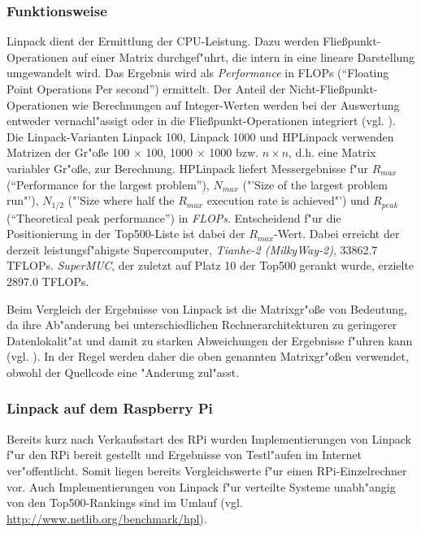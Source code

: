 
\subsubsection{Funktionsweise}\label{Funktion-Linpack}

Linpack dient der Ermittlung der CPU-Leistung. Dazu werden Flie\ss punkt-Operationen auf einer Matrix durchgef"uhrt, die intern in eine lineare Darstellung umgewandelt wird. Das Ergebnis wird als \textit{Performance} in FLOPs ("`Floating Point Operations Per second"') ermittelt. Der Anteil der Nicht-Flie\ss punkt-Operationen wie Berechnungen auf Integer-Werten werden bei der Auswertung entweder vernachl"assigt oder in die Flie\ss punkt-Operationen integriert (vgl. \cite{wei90}). Die Linpack-Varianten Linpack 100, Linpack 1000 und HPLinpack verwenden Matrizen der Gr"o\ss e 100 $\times$ 100, 1000 $\times$ 1000 bzw. $n\times n$, d.h. eine Matrix variabler Gr"o\ss e, zur Berechnung. HPLinpack liefert Messergebnisse f"ur $R_{max}$ ("`Performance for the largest problem"'), $N_{max}$ ("'Size of the largest problem run"'), $N_{1/2}$ ("'Size where half the $R_{max}$ execution rate is achieved"') und $R_{peak}$ ("`Theoretical peak performance"') in \textit{FLOPs}. Entscheidend f"ur die Positionierung in der Top500-Liste ist dabei der $R_{max}$-Wert. Dabei erreicht der derzeit leistungsf"ahigste Supercomputer, \textit{Tianhe-2 (Milky\-Way-2)}, 33862.7 TFLOPs. \textit{SuperMUC}, der zuletzt auf Platz 10 der Top500 gerankt wurde, erzielte 2897.0 TFLOPs.

Beim Vergleich der Ergebnisse von Linpack ist die Matrixgr"o\ss e von Bedeutung, da ihre Ab"anderung bei unterschiedlichen Rechnerarchitekturen zu geringerer Datenlokalit"at und damit zu starken Abweichungen der Ergebnisse f"uhren kann (vgl. \cite{wei90}). In der Regel werden daher die oben genannten Matrixgr"o\ss en verwendet, obwohl der Quellcode eine "Anderung zul"asst. 

\subsubsection{Linpack auf dem Raspberry Pi}\label{Linpack-RPi}

Bereits kurz nach Verkaufsstart des RPi wurden Implementierungen von Linpack f"ur den RPi bereit gestellt und Ergebnisse von Testl"aufen im Internet ver"offentlicht. Somit liegen bereits Vergleichswerte f"ur einen RPi-Einzelrechner vor. Auch Implementierungen von Linpack f"ur verteilte Systeme unabh"angig von den Top500-Rankings sind im Umlauf (vgl. \url{http://www.netlib.org/benchmark/hpl}).


